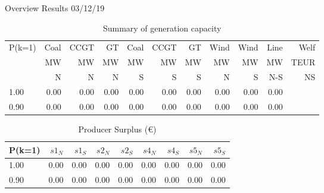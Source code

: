 \documentclass[]{article}
\begin{document}
Overview Results 03/12/19
\begin{table}[htb]\caption{Summary of generation capacity}
\begin{tabular}{l|rrrrrr|rr|r|r}
\toprule
 P(k=1) &    Coal &     CCGT &      GT &   Coal  &   CCGT &      GT &    Wind &    Wind  &    Line   &  Welf   \\
        &      MW &       MW &      MW &      MW &     MW &      MW &      MW &      MW  &    MW     &  TEUR   \\
        &       N &       N  &      N  &      S  &      S &       S &       N &       S  &    N-S    &   NS    \\
\midrule
        1.00&        0.00&        0.00&        0.00&        0.00&        0.00&        0.00&        0.00&        0.00&        0.00\\
        0.90&        0.00&        0.00&        0.00&        0.00&        0.00&        0.00&        0.00&        0.00&        0.00\\
\bottomrule
\end{tabular}
\end{table}
\begin{table}[htb]\caption{Producer Surplus (\euro)}
\begin{tabular}{l|rrrrrrrr}
\toprule
 P(k=1) & $s1_N$ & $s1_S$ & $s2_N$ & $s2_S$   & $s4_N$ & $s4_S$  & $s5_N$ & $s5_S$ \\
\midrule
        1.00&\num{        0.00}&\num{        0.00}&\num{        0.00}&\num{        0.00}&\num{        0.00}&\num{        0.00}&\num{        0.00}&\num{        0.00}\\
        0.90&\num{        0.00}&\num{        0.00}&\num{        0.00}&\num{        0.00}&\num{        0.00}&\num{        0.00}&\num{        0.00}&\num{        0.00}\\
\bottomrule
\end{tabular}
\end{table}
\end{document}
